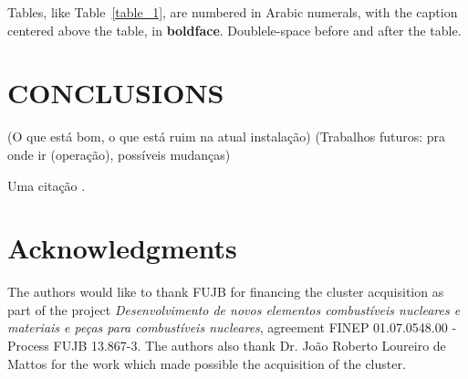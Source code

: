 \documentclass[twoside,a4paper,12pt,english,draft]{inac17}
\begin{document}
Tables, like Table~\ref{table_1}, are numbered in Arabic numerals, with the caption centered above the table, in {\bf boldface}.  Doublele-space before and after the table.


\section{CONCLUSIONS}

(O que está bom, o que está ruim na atual instalação)
(Trabalhos futuros: pra onde ir (operação), possíveis mudanças)

Uma cita\c{c}\~{a}o \cite{Henderson17}.


\section*{Acknowledgments}
The authors would like to thank FUJB for financing the cluster acquisition
as part of the project \textit{Desenvolvimento de novos elementos combust\'{i}veis nucleares
  e materiais e pe\c{c}as para combust\'{i}veis nucleares}, agreement FINEP 01.07.0548.00 - Process FUJB 13.867-3.
The authors also thank Dr. Jo\~{a}o Roberto Loureiro de Mattos for the work which made possible the acquisition
of the cluster.











\end{document}
